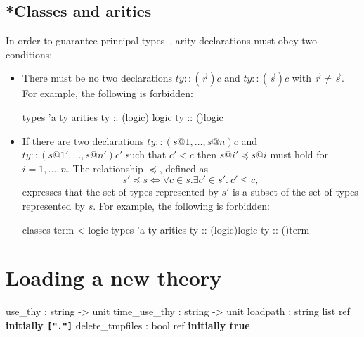 \subsection{*Classes and arities}

In order to guarantee principal types~\cite{nipkow-prehofer},
arity declarations must obey two conditions:
\begin{itemize}
\item There must be no two declarations $ty :: (\vec{r})c$ and $ty ::
  (\vec{s})c$ with $\vec{r} \neq \vec{s}$.  For example, the following is
  forbidden:
\begin{ttbox}
types 'a ty
arities ty :: ({\ttlbrace}logic{\ttrbrace}) logic
        ty :: ({\ttlbrace}{\ttrbrace})logic
\end{ttbox}

\item If there are two declarations $ty :: (s@1,\dots,s@n)c$ and $ty ::
  (s@1',\dots,s@n')c'$ such that $c' < c$ then $s@i' \preceq s@i$ must hold
  for $i=1,\dots,n$.  The relationship $\preceq$, defined as
\[ s' \preceq s \iff \forall c\in s. \exists c'\in s'.~ c'\le c, \]
expresses that the set of types represented by $s'$ is a subset of the set of
types represented by $s$.  For example, the following is forbidden:
\begin{ttbox}
classes term < logic
types 'a ty
arities ty :: ({\ttlbrace}logic{\ttrbrace})logic
        ty :: ({\ttlbrace}{\ttrbrace})term
\end{ttbox}

\end{itemize}


\section{Loading a new theory}\label{LoadingTheories}
\begin{ttbox} 
use_thy         : string -> unit
time_use_thy    : string -> unit
loadpath        : string list ref \hfill{\bf initially {\tt["."]}}
delete_tmpfiles : bool ref \hfill{\bf initially true}
\end{ttbox}

